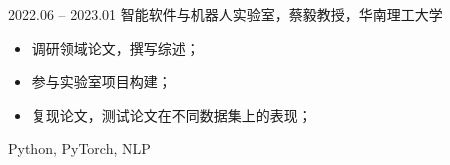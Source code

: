 %
%

 
\begin{experiences}
  \experiencenew
  {2022.06 -- 2023.01} {智能软件与机器人实验室，蔡毅教授，华南理工大学 }
  {
    \begin{itemize}
  		\item 调研领域论文，撰写综述；
  		\item 参与实验室项目构建；
  		\item 复现论文，测试论文在不同数据集上的表现；
  	\end{itemize}
                }
                {Python, PyTorch, NLP}


\end{experiences}
